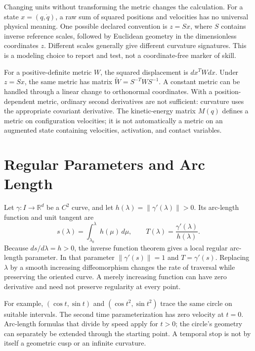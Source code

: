 \documentclass[12pt, openany]{book}
\theoremstyle{plain}
\begin{document}
Changing units without transforming the metric changes the calculation.
For a state $x=(q,\dot q)$, a raw sum of squared positions and velocities has
no universal physical meaning. One possible declared convention is
$z=Sx$, where $S$ contains inverse reference scales, followed by Euclidean
geometry in the dimensionless coordinates $z$. Different scales generally
give different curvature signatures. This is a modeling choice to report
and test, not a coordinate-free marker of skill.

For a positive-definite metric $W$, the squared displacement is
$dx^T W dx$. Under $z=Sx$, the same metric has matrix
$\widetilde W=S^{-T}WS^{-1}$. A constant metric can be handled through a
linear change to orthonormal coordinates. With a position-dependent metric,
ordinary second derivatives are not sufficient: curvature uses the
appropriate covariant derivative. The kinetic-energy matrix $M(q)$ defines
a metric on configuration velocities; it is not automatically a metric on
an augmented state containing velocities, activation, and contact variables.

\section{Regular Parameters and Arc Length}

Let $\gamma:I\rightarrow\mathbb R^d$ be a $C^2$ curve, and let
$h(\lambda)=\|\gamma'(\lambda)\|>0$. Its arc-length function and unit tangent are
\begin{equation}\label{eq:arc_length}
 s(\lambda)=\int_{\lambda_0}^{\lambda}h(\mu)\,d\mu,
 \qquad T(\lambda)=\frac{\gamma'(\lambda)}{h(\lambda)}.
\end{equation}
Because $ds/d\lambda=h>0$, the inverse function theorem gives a local regular
arc-length parameter. In that parameter $\|\gamma'(s)\|=1$ and
$T=\gamma'(s)$. Replacing $\lambda$ by a smooth increasing diffeomorphism
changes the rate of traversal while preserving the oriented curve.
A merely increasing function can have zero derivative and need not preserve
regularity at every point.

For example, $(\cos t,\sin t)$ and $(\cos t^2,\sin t^2)$ trace the same circle
on suitable intervals. The second time parameterization has zero velocity
at $t=0$. Arc-length formulas that divide by speed apply for $t>0$; the
circle's geometry can separately be extended through the starting point.
A temporal stop is not by itself a geometric cusp or an infinite curvature.
\end{document}
